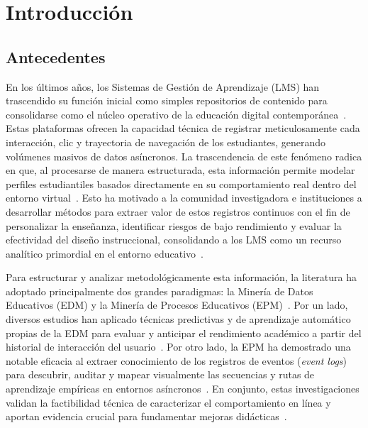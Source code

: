 \chapter{Introducción}

\section{Antecedentes}
En los últimos años, los Sistemas de Gestión de Aprendizaje (LMS) han trascendido su función inicial como simples repositorios de contenido para consolidarse como el núcleo operativo de la educación digital contemporánea~\cite{Supriyanto2025,YeseniaZavaleta-Sanchez2025}. Estas plataformas ofrecen la capacidad técnica de registrar meticulosamente cada interacción, clic y trayectoria de navegación de los estudiantes, generando volúmenes masivos de datos asíncronos. La trascendencia de este fenómeno radica en que, al procesarse de manera estructurada, esta información permite modelar perfiles estudiantiles basados directamente en su comportamiento real dentro del entorno virtual~\cite{YeseniaZavaleta-Sanchez2025}. Esto ha motivado a la comunidad investigadora e instituciones a desarrollar métodos para extraer valor de estos registros continuos con el fin de personalizar la enseñanza, identificar riesgos de bajo rendimiento y evaluar la efectividad del diseño instruccional, consolidando a los LMS como un recurso analítico primordial en el entorno educativo~\cite{Mercado2024,Setiadi2025}.

Para estructurar y analizar metodológicamente esta información, la literatura ha adoptado principalmente dos grandes paradigmas: la Minería de Datos Educativos (EDM) y la Minería de Procesos Educativos (EPM)~\cite{Semler2025}. Por un lado, diversos estudios han aplicado técnicas predictivas y de aprendizaje automático propias de la EDM para evaluar y anticipar el rendimiento académico a partir del historial de interacción del usuario~\cite{Mercado2024,Setiadi2025}. Por otro lado, la EPM ha demostrado una notable eficacia al extraer conocimiento de los registros de eventos (\textit{event logs}) para descubrir, auditar y mapear visualmente las secuencias y rutas de aprendizaje empíricas en entornos asíncronos~\cite{AlQaheri2022,Supriyanto2025}. En conjunto, estas investigaciones validan la factibilidad técnica de caracterizar el comportamiento en línea y aportan evidencia crucial para fundamentar mejoras didácticas~\cite{Semler2025}.

